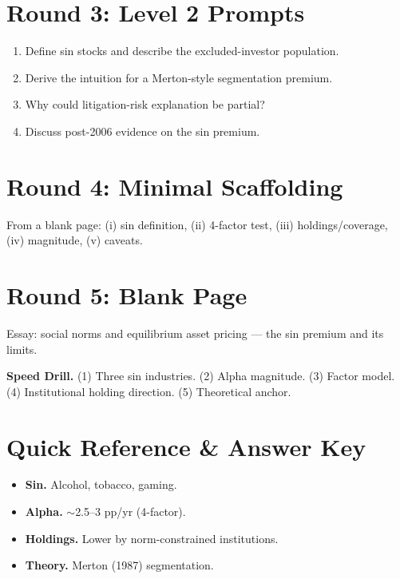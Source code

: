 \documentclass[11pt]{article}
\begin{document}
\section*{Round 3: Level 2 Prompts}
\begin{enumerate}
\item Define sin stocks and describe the excluded-investor population.
\item Derive the intuition for a Merton-style segmentation premium.
\item Why could litigation-risk explanation be partial?
\item Discuss post-2006 evidence on the sin premium.
\end{enumerate}

\section*{Round 4: Minimal Scaffolding}
From a blank page: (i) sin definition, (ii) 4-factor test, (iii) holdings/coverage, (iv) magnitude, (v) caveats.

\section*{Round 5: Blank Page}
Essay: social norms and equilibrium asset pricing --- the sin premium and its limits.

\vspace{6pt}
\begin{drillbox}
\textbf{Speed Drill.} (1) Three sin industries. (2) Alpha magnitude. (3) Factor model. (4) Institutional holding direction. (5) Theoretical anchor.
\end{drillbox}

\section*{Quick Reference \& Answer Key}
\begin{answerbox}
\begin{itemize}
\item \textbf{Sin.} Alcohol, tobacco, gaming.
\item \textbf{Alpha.} $\sim$2.5--3 pp/yr (4-factor).
\item \textbf{Holdings.} Lower by norm-constrained institutions.
\item \textbf{Theory.} Merton (1987) segmentation.
\end{itemize}
\end{answerbox}
\end{document}
